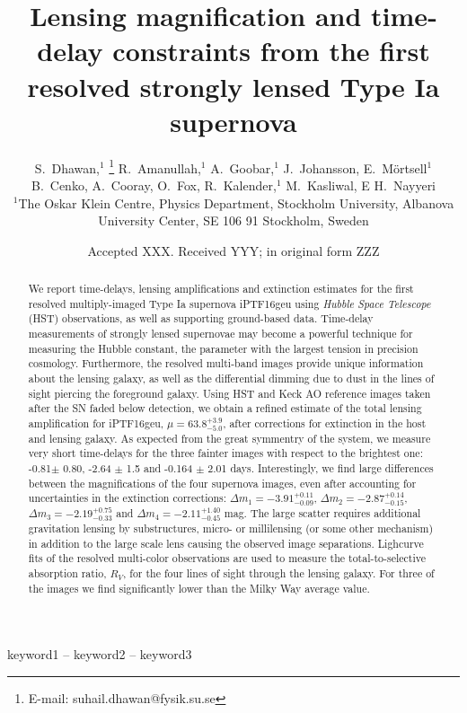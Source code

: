 \documentclass[a4paper,fleqn,usenatbib]{mnras}
\title[Lensing magnification and time-delay constraints from \geu]{Lensing magnification and time-delay constraints from the first resolved strongly lensed Type Ia supernova \geu}
\author[Dhawan et al.]{%
S.~Dhawan,$^{1}$ \thanks{E-mail: suhail.dhawan@fysik.su.se}
R.~Amanullah,$^{1}$
A.~Goobar,$^{1}$
J.~Johansson,
E.~M\"ortsell$^{1}$
\newauthor
B.~Cenko,
A.~Cooray,
O.~Fox,
R.~Kalender,$^{1}$
\newauthor
M.~Kasliwal,
E
H.~Nayyeri
\\
$^{1}$The Oskar Klein Centre, Physics Department,
    Stockholm University,
    Albanova University Center, SE 106 91 Stockholm, Sweden\\
}
\date{Accepted XXX. Received YYY; in original form ZZZ}
\begin{document}
\label{firstpage}
\pagerange{\pageref{firstpage}--\pageref{lastpage}}
\maketitle

\begin{abstract}
We report time-delays, lensing amplifications and extinction estimates for the first resolved multiply-imaged Type Ia supernova iPTF16geu using \emph{Hubble Space Telescope} (HST) observations, as well as supporting ground-based data. Time-delay measurements of strongly lensed supernovae may become a powerful technique for measuring the Hubble constant, the parameter with the largest tension in precision cosmology. Furthermore, the resolved multi-band images provide unique information about the lensing galaxy, as well as the differential dimming due to dust in the lines of sight piercing the foreground galaxy. Using HST and Keck AO reference images taken after the SN faded below detection, we  obtain a refined estimate of the total lensing amplification for iPTF16geu,  $\mu = 63.8^{+3.9}_{-5.0}$, after corrections for extinction in the host and lensing galaxy.
As expected from the great symmentry of the system, we measure very short  time-delays for the three fainter images with respect to the brightest one: -0.81$\pm$ 0.80, -2.64 $\pm$ 1.5 and -0.164 $\pm$ 2.01 days.  Interestingly, we find large differences between the magnifications of the four supernova images, even after accounting for uncertainties in the extinction corrections:  $\Delta m_1 = -3.91^{+0.11}_{-0.09}$,   $\Delta m_2 =  -2.87^{+0.14}_{-0.15}$,  $\Delta m_3 = -2.19^{+0.75}_{-0.33}$ and  $\Delta m_4 = -2.11^{+1.40}_{-0.45}$ mag. The  large scatter requires additional gravitation lensing by substructures, micro- or millilensing (or some other mechanism) in addition to the large scale lens causing the observed image separations. 
Lighcurve fits of the resolved  multi-color observations are used to measure  
the total-to-selective absorption ratio, $R_V$, for the four lines of sight through the lensing galaxy. For three of the images we find significantly lower than the Milky Way average value.
\end{abstract}
\begin{keywords}
keyword1 -- keyword2 -- keyword3
\end{keywords}
\end{document}
